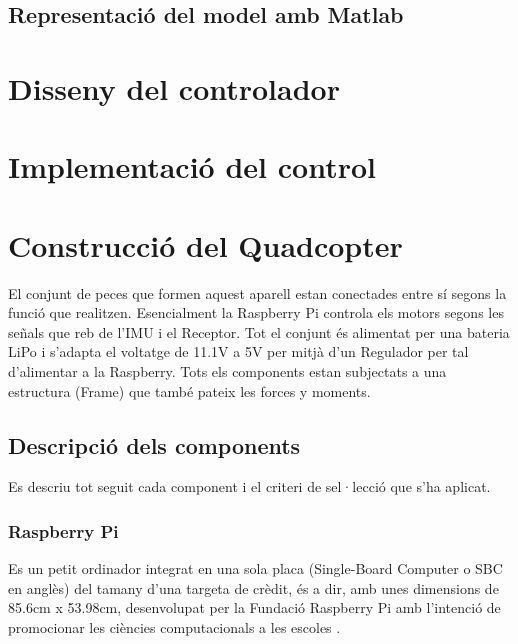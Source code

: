 \documentclass[twoside]{article}
\begin{document}
\subsection{Representació del model amb Matlab}





\newpage
\section{Disseny del controlador}
\newpage
\section{Implementació del control} 

\newpage
\section{Construcció del Quadcopter}
El conjunt de peces que formen aquest aparell estan conectades entre sí segons la funció que realitzen. Esencialment la Raspberry Pi controla els motors segons les señals que reb de l'IMU i el Receptor. Tot el conjunt és alimentat per una bateria LiPo i s'adapta el voltatge de 11.1V a 5V per mitjà d'un Regulador per tal d'alimentar a la Raspberry. Tots els components estan subjectats a una estructura (Frame) que també pateix les forces y moments.  

\subsection{Descripció dels components}
Es descriu tot seguit cada component i el criteri de sel·lecció que s'ha aplicat.
\subsubsection*{Raspberry Pi} 
Es un petit ordinador integrat en una sola placa (Single-Board Computer o SBC en anglès) del tamany d'una targeta de crèdit, és a dir, amb unes dimensions de 85.6cm x 53.98cm, desenvolupat per la Fundació Raspberry Pi amb l'intenció de promocionar les ciències computacionals a les escoles \cite{RPiWiki}. 
\end{document}
